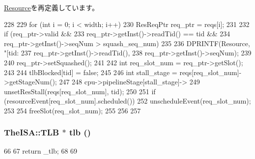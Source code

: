 \hyperlink{classResource_a52235c5e3d912452f254dc45f1496fd2}{Resource}を再定義しています。


\begin{DoxyCode}
228 {
229     for (int i = 0; i < width; i++) {
230         ResReqPtr req_ptr = reqs[i];
231 
232          if (req_ptr->valid &&
233              req_ptr->getInst()->readTid() == tid &&
234              req_ptr->getInst()->seqNum > squash_seq_num) {
235 
236              DPRINTF(Resource, "[tid:%
237                      req_ptr->getInst()->readTid(),
238                      req_ptr->getInst()->seqNum);
239 
240              req_ptr->setSquashed();
241 
242              int req_slot_num = req_ptr->getSlot();
243 
244              tlbBlocked[tid] = false;
245 
246              int stall_stage = reqs[req_slot_num]->getStageNum();
247 
248              cpu->pipelineStage[stall_stage]->
249                  unsetResStall(reqs[req_slot_num], tid);
250 
251              if (resourceEvent[req_slot_num].scheduled())
252                  unscheduleEvent(req_slot_num);
253 
254              freeSlot(req_slot_num);
255          }
256      }
257 }
\end{DoxyCode}
\hypertarget{classTLBUnit_a3cf8b27760278d20d4aa9463f52a2d95}{
\subsubsection[{tlb}]{\setlength{\rightskip}{0pt plus 5cm}TheISA::TLB $\ast$ tlb ()}}
\label{classTLBUnit_a3cf8b27760278d20d4aa9463f52a2d95}



\begin{DoxyCode}
66 {
67     return _tlb;
68 
69 }
\end{DoxyCode}


